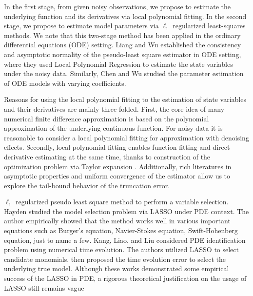 \documentclass[a4paper,11pt]{article}
\theoremstyle{definition}
\newcommand{\mei}[1]{\color{blue}{#1 }\color{black}}
\begin{document}
\mei{From the methodology or algorithm point of view, we develop a two stage method for PDE Identification based on the $\ell_1$-regularized Pseudo Least Square ($\ell_1$-PsL) model and local polynomial approximation.} In the first stage, from given noisy observations, we propose to estimate the underlying function and its derivatives via local polynomial fitting.  In the second stage, we propose to estimate model parameters via  $\ell_{1}$ regularized least-squares methods. We note that this two-stage method has been applied in the ordinary differential equations (ODE) setting. Liang and Wu \cite{liang2008parameter} established the consistency and asymptotic normality of the pseudo-least square estimator in ODE setting, where they used Local Polynomial Regression to estimate the state variables under the noisy data. Similarly, Chen and Wu \cite{chen2008efficient,chen2008estimation} studied the parameter estimation of ODE models with varying coefficients. \mei{However, research is limited when using this two-stage method to the PDE context.}


Reasons for using the local polynomial fitting to the estimation of state variables and their derivatives \mei{in PDE} are mainly three-folded.  First, the core idea of many numerical finite difference approximation is based on the polynomial approximation of the underlying continuous function.  For noisy data it is reasonable to consider a local polynomial fitting for approximation with denoising effects.  Secondly, local polynomial fitting enables function fitting and direct derivative estimating at the same time, thanks to construction of the optimization problem via Taylor expansion \cite{fan1997local}.   Additionally,  rich literatures in asymptotic properties and uniform convergence of the estimator \cite{fan1997local,tusnady1977remark,mack1982weak} allow us to explore the tail-bound behavior of the truncation error.

\mei{It has been widely used to apply} $\ell_1$ regularized pseudo least square method to perform a variable selection.   Hayden \cite{schaeffer2017learning} studied the model selection problem via LASSO under PDE context.  The author  empirically showed that the method works well in various important equations such as Burger's equation, Navier-Stokes equation, Swift-Hohenberg equation, just to name a few.   Kang, Liao, and Liu \cite{kang2019ident} considered PDE identification problem using numerical time evolution. The authors utilized LASSO to select candidate monomials, then proposed the time evolution error to select the underlying true model.  Although these works demonstrated some empirical success of the LASSO in PDE, a rigorous theoretical justification on the usage of LASSO still remains vague  \mei{in PDE identification.}
\end{document}
